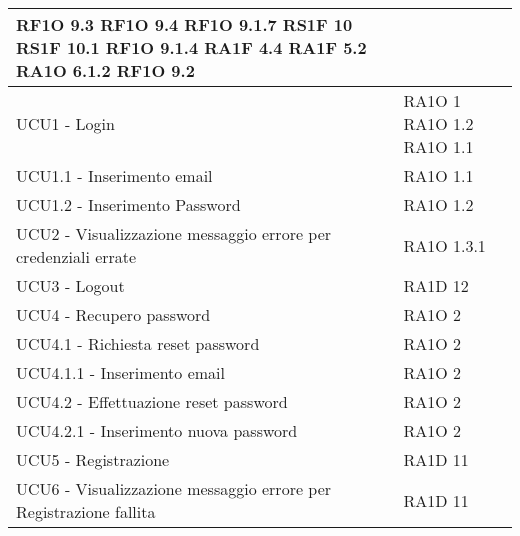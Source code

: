 \begin{center}
\begin{longtable}{ | p{5cm} | p{5cm} |}
RF1O 9.3 \newline  RF1O 9.4 \newline  RF1O 9.1.7 \newline  RS1F 10 \newline  RS1F 10.1 \newline  RF1O 9.1.4  \newline  RA1F 4.4 \newline  RA1F 5.2 \newline  RA1O 6.1.2  \newline  RF1O 9.2 \newline  \\ \hline      
            UCU1 - Login &  RA1O 1 \newline  RA1O 1.2 \newline  RA1O 1.1 \newline  \\ \hline      
            UCU1.1 - Inserimento email &  RA1O 1.1 \newline  \\ \hline      
            UCU1.2 - Inserimento Password &  RA1O 1.2 \newline  \\ \hline      
            UCU2 - Visualizzazione messaggio errore per credenziali errate &  RA1O 1.3.1 \newline  \\ \hline      
            UCU3 - Logout &  RA1D 12 \newline  \\ \hline      
            UCU4 - Recupero password &  RA1O 2  \newline  \\ \hline      
            UCU4.1 - Richiesta reset password &  RA1O 2  \newline  \\ \hline      
            UCU4.1.1 - Inserimento email &  RA1O 2  \newline  \\ \hline      
            UCU4.2 - Effettuazione reset password &  RA1O 2  \newline  \\ \hline      
            UCU4.2.1 - Inserimento nuova password &  RA1O 2  \newline  \\ \hline      
            UCU5 - Registrazione &  RA1D 11 \newline  \\ \hline      
            UCU6 - Visualizzazione messaggio errore per Registrazione fallita &  RA1D 11 \newline  \\ \hline      

\end{longtable}
\end{center}
